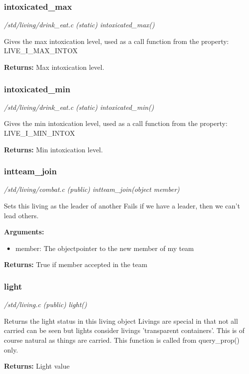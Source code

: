 \subsubsection{intoxicated\_max}

{\em /std/living/drink\_eat.c (static) intoxicated\_max()}

Gives the max intoxication level, used as a call
function from the property: LIVE\_I\_MAX\_INTOX

{\bf Returns:}      Max intoxication level.


\subsubsection{intoxicated\_min}

{\em /std/living/drink\_eat.c (static) intoxicated\_min()}

Gives the min intoxication level, used as a call
function from the property: LIVE\_I\_MIN\_INTOX

{\bf Returns:}      Min intoxication level.


\subsubsection{intteam\_join}

{\em /std/living/combat.c (public) intteam\_join(object member)}

Sets this living as the leader of another
Fails if we have a leader, then we can't lead others.

{\bf Arguments:}
\begin{itemize}
\item     member: The objectpointer to the new member of my team
\end{itemize}

{\bf Returns:}        True if member accepted in the team


\subsubsection{light}

{\em /std/living.c (public) light()}

Returns the light status in this living object
Livings are special in that not all carried can be seen
but lights consider livings 'transparent containers'. This
is of course natural as things are carried.
This function is called from query\_prop() only.

{\bf Returns:}    Light value


